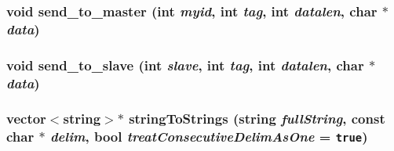 \subsubsection{\setlength{\rightskip}{0pt plus 5cm}void send\_\-to\_\-master (int {\em myid}, int {\em tag}, int {\em datalen}, char $\ast$ {\em data})}\label{Scheduler_8h_4b626becaf7739de57ffa8462e81991a}


\subsubsection{\setlength{\rightskip}{0pt plus 5cm}void send\_\-to\_\-slave (int {\em slave}, int {\em tag}, int {\em datalen}, char $\ast$ {\em data})}\label{Scheduler_8h_d66eee2c0be0214ff5cb6269c0b3fb0c}


\subsubsection{\setlength{\rightskip}{0pt plus 5cm}vector$<$string$>$$\ast$ stringToStrings (string {\em fullString}, const char $\ast$ {\em delim}, bool {\em treatConsecutiveDelimAsOne} = {\tt true})}\label{Scheduler_8h_57f3d52b8c7939235a5622f5509fb58b}


